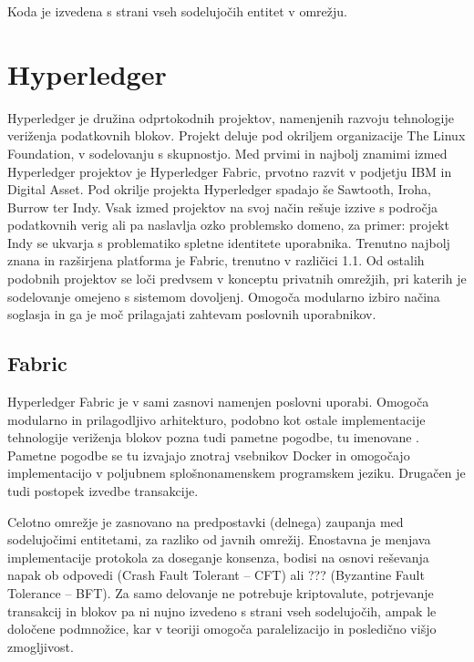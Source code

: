 \documentclass[a4paper, 12pt]{book}
\begin{document}
Koda je izvedena s strani vseh sodelujočih entitet v omrežju. \cite{ethereumWhitepaper}

\section{Hyperledger}
Hyperledger je družina odprtokodnih projektov, namenjenih razvoju tehnologije veriženja podatkovnih blokov.
Projekt deluje pod okriljem organizacije The Linux Foundation, v sodelovanju s skupnostjo.
Med prvimi in najbolj znamimi izmed Hyperledger projektov je Hyperledger Fabric, prvotno razvit v podjetju IBM in Digital Asset.
Pod okrilje projekta Hyperledger spadajo še Sawtooth, Iroha, Burrow ter Indy.
Vsak izmed projektov na svoj način rešuje izzive s področja podatkovnih verig ali pa naslavlja ozko problemsko domeno, za primer: projekt Indy se ukvarja s problematiko spletne identitete uporabnika. \cite{hyperledgerWeb}
Trenutno najbolj znana in razširjena platforma je Fabric, trenutno v različici 1.1.
Od ostalih podobnih projektov se loči predvsem v konceptu privatnih omrežjih, pri katerih je sodelovanje omejeno s sistemom dovoljenj.
Omogoča modularno izbiro načina soglasja in ga je moč prilagajati zahtevam poslovnih uporabnikov. \cite{hyperledgerIbm}

\subsection{Fabric}
Hyperledger Fabric je v sami zasnovi namenjen poslovni uporabi.
Omogoča modularno in prilagodljivo arhitekturo, podobno kot ostale implementacije tehnologije veriženja blokov pozna tudi pametne pogodbe, tu imenovane .
Pametne pogodbe se tu izvajajo znotraj vsebnikov Docker in omogočajo implementacijo v poljubnem splošnonamenskem programskem jeziku.
Drugačen je tudi postopek izvedbe transakcije.

Celotno omrežje je zasnovano na predpostavki (delnega) zaupanja med sodelujočimi entitetami, za razliko od javnih omrežij.
Enostavna je menjava implementacije protokola za doseganje konsenza, bodisi na osnovi reševanja napak ob odpovedi (Crash Fault Tolerant -- CFT) ali ??? (Byzantine Fault Tolerance -- BFT).
Za samo delovanje ne potrebuje kriptovalute, potrjevanje transakcij in blokov pa ni nujno izvedeno s strani vseh sodelujočih, ampak le določene podmnožice, kar v teoriji omogoča paralelizacijo in posledično višjo zmogljivost.
\end{document}
